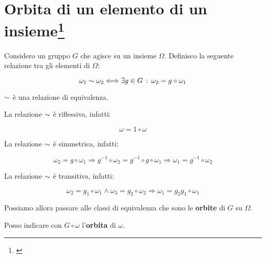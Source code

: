 \section[Orbita di un elemento di un insieme]{Orbita di un elemento di un insieme\footnote{\cite[8 novembre 2021]{lucchini}}}

Considero un gruppo $G$ che agisce su un insieme $\Omega$. Definisco la seguente relazione tra gli elementi di $\Omega$:

\begin{equation}
	\omega_1 \sim \omega_2 \Longleftrightarrow \exists g \in G \,:\, \omega_2 = g \circ \omega_1
\end{equation}

\begin{teorema}
	$\sim$ è una relazione di equivalenza.
\end{teorema}
\begin{dimostrazione}
	La relazione $\sim$ è riflessiva, infatti:
	
	\begin{equation}
		\omega = 1 \circ \omega
	\end{equation}

	La relazione $\sim$ è simmetrica, infatti:
	
	\begin{equation}
		\omega_2 = g \circ \omega_1 \Longrightarrow g^{-1} \circ \omega_2 = g^{-1} \circ g \circ \omega_1 \Longrightarrow \omega_1 = g^{-1} \circ \omega_2
	\end{equation}

	La relazione $\sim$ è transitiva, infatti:
	
	\begin{equation}
		\omega_2 = g_1 \circ \omega_1 \land \omega_3 = g_2 \circ \omega_2 \Longrightarrow \omega_1 = g_2g_1 \circ \omega_1
	\end{equation}
\end{dimostrazione}

Possiamo allora passare alle classi di equivalenza che sono le \textbf{orbite} di $G$ su $\Omega$.

Posso indicare con $G \circ \omega$ l'\textbf{orbita} di $\omega$.

